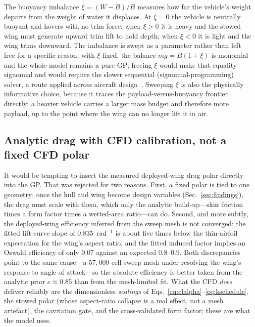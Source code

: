 \documentclass[conf]{new-aiaa}
\begin{document}
The buoyancy imbalance $\xi=(W-B)/B$ measures how far the vehicle's weight departs from the weight of
water it displaces. At $\xi=0$ the vehicle is neutrally buoyant and hovers with no trim force; when
$\xi>0$ it is heavy and the stowed wing must generate upward trim lift to hold depth; when $\xi<0$ it
is light and the wing trims downward. The imbalance is swept as a parameter rather than left free for
a specific reason: with $\xi$ fixed, the balance $mg=B(1+\xi)$ is monomial and the whole model
remains a pure GP; freeing $\xi$ would make that equality signomial and would require the slower
sequential (signomial-programming) solver, a route applied across aircraft design~\cite{kirschen2018application}. Sweeping $\xi$ is also the physically informative choice,
because it traces the payload-versus-buoyancy frontier directly: a heavier vehicle carries a larger
mass budget and therefore more payload, up to the point where the wing can no longer lift it in air.

\subsection{Analytic drag with CFD calibration, not a fixed CFD polar}
It would be tempting to insert the measured deployed-wing drag polar directly into the GP. That was
rejected for two reasons. First, a fixed polar is tied to one geometry; once the hull and wing become
design variables (Sec.~\ref{sec:findings}), the drag must scale with them, which only the analytic
build-up---skin friction times a form factor times a wetted-area ratio---can do. Second, and more
subtly, the deployed-wing efficiency inferred from the sweep mesh is not converged: the fitted
lift-curve slope of $0.835$~rad$^{-1}$ is about five times below the thin-airfoil expectation for the
wing's aspect ratio, and the fitted induced factor implies an Oswald efficiency of only $0.07$
against an expected $0.8$--$0.9$. Both discrepancies point to the same cause---a $57{,}000$-cell
sweep mesh under-resolving the wing's response to angle of attack---so the absolute efficiency is
better taken from the analytic prior $e\approx0.85$ than from the mesh-limited fit. What the CFD
\emph{does} deliver reliably are the dimensionless \emph{scalings} of
Eqs.~\eqref{eq:clalpha}--\eqref{eq:kschedule}, the stowed polar (whose aspect-ratio collapse is a
real effect, not a mesh artefact), the cavitation gate, and the cross-validated form factor; these
are what the model uses.
\end{document}
